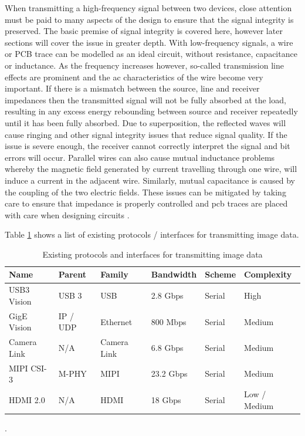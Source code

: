 \documentclass[a4paper]{report}
\begin{document}
When transmitting a high-frequency signal between two devices, close attention must be paid to many aspects of the design to ensure that the signal integrity is preserved. The basic premise of signal integrity is covered here, however later sections will cover the issue in greater depth. With low-frequency signals, a wire or PCB trace can be modelled as an ideal circuit, without resistance, capacitance or inductance. As the frequency increases however, so-called transmission line effects are prominent and the \gls{ac} characteristics of the wire become very important. If there is a mismatch between the source, line and receiver impedances then the transmitted signal will not be fully absorbed at the load, resulting in any excess energy rebounding between source and receiver repeatedly until it has been fully absorbed. Due to superposition, the reflected waves will cause ringing and other signal integrity issues that reduce signal quality. If the issue is severe enough, the receiver cannot correctly interpret the signal and bit errors will occur. Parallel wires can also cause mutual inductance problems whereby the magnetic field generated by current travelling through one wire, will induce a current in the adjacent wire. Similarly, mutual capacitance is caused by the coupling of the two electric fields. These issues can be mitigated by taking care to ensure that impedance is properly controlled and \gls{pcb} traces are placed with care when designing circuits \cite{15_basic_principles_of_signal_integrity_2007}.

Table \ref{table:existing_protocols} shows a list of existing protocols / interfaces for transmitting image data.

\begin{table}
  \centering
  \begin{tabular}{llllll}
  Name      & Parent  & Family    & Bandwidth & Scheme  & Complexity \\
  \hline
  USB3 Vision   & USB 3   & USB       & 2.8 Gbps  & Serial  & High \\
  GigE Vision   & IP / UDP  & Ethernet    & 800 Mbps  & Serial  & Medium \\
  Camera Link   & N/A     & Camera Link   & 6.8 Gbps  & Serial  & Medium \\
  MIPI CSI-3  & M-PHY   & MIPI      & 23.2 Gbps & Serial  & Medium \\
  HDMI 2.0    & N/A     & HDMI      & 18 Gbps   & Serial  & Low / Medium
  \end{tabular}
  \caption{Existing protocols and interfaces for transmitting image data      \protect\cite{16_von_fintel_2013,17_arrowdevices.com_2014,18_hdmi.org}}.
  \label{table:existing_protocols}
\end{table}
\end{document}
